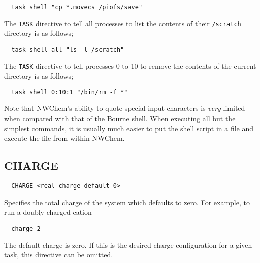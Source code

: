 \begin{verbatim}
  task shell "cp *.movecs /piofs/save"
\end{verbatim}

The \verb+TASK+ directive to tell all processes to list the contents of 
their \verb+/scratch+ directory is as follows;

\begin{verbatim}
  task shell all "ls -l /scratch"
\end{verbatim}

The \verb+TASK+ directive to tell processes 0 to 10 to remove the 
contents of the current directory is as follows;

\begin{verbatim}
  task shell 0:10:1 "/bin/rm -f *"
\end{verbatim}

Note that NWChem's ability to  quote
special input characters is {\em very} limited when compared with that
of the Bourne shell.  When executing all 
but the simplest commands, it is usually much easier to put the shell 
script in a file and execute the file from within NWChem.

\subsection{CHARGE}
\label{sec:charge}

\begin{verbatim}
  CHARGE <real charge default 0>
\end{verbatim}

Specifies the total charge of the system which defaults to zero.
For example, to run a doubly charged cation
\begin{verbatim}
  charge 2
\end{verbatim}

The default charge is zero.  If this is the desired charge configuration
for a given task, this directive can be omitted.

